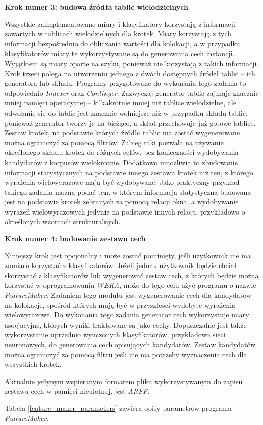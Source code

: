 \par
\noindent\textbf{Krok numer 3: budowa źródła tablic wielodzielnych}
\par
Wszystkie zaimplementowane miary i klasyfikatory korzystają z informacji zawartych w tablicach wielodzielnych dla krotek. 
Miary korzystają z tych informacji bezpośrednio do obliczania wartości dla kolokacji, a w przypadku klasyfikatorów miary te wykorzystywane są do generowania cech instancji.
Wyjątkiem są miary oparte na szyku, ponieważ nie korzystają z takich informacji.
Krok trzeci polega na utworzeniu jednego z dwóch dostępnych źródeł tablic -- ich generatora lub składu. 
Programy przygotowane do wykonania tego zadania to odpowiednio \emph{Indexer} oraz \emph{Continger}.
Zazwyczaj generator tablic zajmuje znacznie mniej pamięci operacyjnej -- kilkakrotnie mniej niż tablice wielodzielne, ale odwołanie się do tablic jest znacznie wolniejsze niż w przypadku składu tablic, ponieważ generator tworzy je na bieżąco, a skład przechowuje już gotowe tablice.
Zestaw krotek, na podstawie których źródło tablic ma zostać wygenerowane można ograniczyć za pomocą filtrów.
Zabieg taki pozwala na używanie określonego składu krotek do różnych celów, bez konieczności wydobywania kandydatów z korpusów wielokrotnie.
Dodatkowo umożliwia to zbudowanie informacji statystycznych na podstawie innego zestawu krotek niż ten, z którego wyrażenia wielowyrazowe mają być wydobywane.
Jako praktyczny przykład takiego zadania można podać ten, w którym informacja statystyczna budowana jest na podstawie krotek zebranych za pomocą relacji okna, a wydobywanie wyrażeń wielowyrazowych jedynie na podstawie innych relacji, przykładowo o określonych wzorcach strukturalnych.

\par
\noindent\textbf{Krok numer 4: budowanie zestawu cech}
\par
Niniejszy krok jest opcjonalny i może zostać pominięty, jeśli użytkownik nie ma zamiaru korzystać z klasyfikatorów.
Jeżeli jednak użytkownik będzie chciał skorzystać z klasyfikatorów lub wygenerować zestaw cech, z których będzie można korzystać w oprogramowaniu \emph{WEKA}, może do tego celu użyć programu o nazwie \emph{FeatureMaker}.
Zadaniem tego modułu jest wygenerowanie cech dla kandydatów na kolokacje, spośród których mają być w przyszłości wydobyte wyrażenia wielowyrazowe.
Do wykonania tego zadania generator cech wykorzystuje miary asocjacyjne, których wyniki traktowane są jako cechy.
Dopuszczalne jest także wykorzystanie uprzednio wyuczonych klasyfikatorów, przykładowo sieci neuronowych, do generowania cech opisujących kandydatów.
Zestaw kandydatów można ograniczyć za pomocą filtru jeśli nie ma potrzeby wyznaczenia cech dla wszystkich krotek.
\par
Aktualnie jedynym wspieranym formatem pliku wykorzystywanym do zapisu zestawu cech w pamięci nieulotnej, jest \emph{ARFF}.
\par
Tabela \ref{feature_maker_parameters} zawiera opisy parametrów programu \emph{FeatureMaker}.

